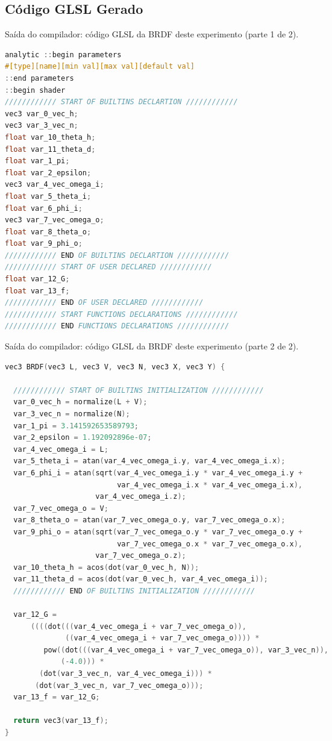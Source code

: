 \subsection{Código GLSL Gerado}
\begin{codigo}[H]
    \caption{\small Saída do compilador: código GLSL da BRDF deste experimento (parte 1 de 2).}
    \label{cod-duer-glsl-pt-1}
\begin{lstlisting}[language=C, inputencoding=utf8]
analytic ::begin parameters
#[type][name][min val][max val][default val]
::end parameters
::begin shader
//////////// START OF BUILTINS DECLARTION ////////////
vec3 var_0_vec_h;
vec3 var_3_vec_n;
float var_10_theta_h;
float var_11_theta_d;
float var_1_pi;
float var_2_epsilon;
vec3 var_4_vec_omega_i;
float var_5_theta_i;
float var_6_phi_i;
vec3 var_7_vec_omega_o;
float var_8_theta_o;
float var_9_phi_o;
//////////// END OF BUILTINS DECLARTION ////////////
//////////// START OF USER DECLARED ////////////
float var_12_G;
float var_13_f;
//////////// END OF USER DECLARED ////////////
//////////// START FUNCTIONS DECLARATIONS ////////////
//////////// END FUNCTIONS DECLARATIONS ////////////

\end{lstlisting}
\end{codigo}

\begin{codigo}[H]
    \caption{\small Saída do compilador: código GLSL da BRDF deste experimento (parte 2 de 2).}
    \label{cod-duer-glsl-pt-2}
\begin{lstlisting}[language=C, inputencoding=utf8]
vec3 BRDF(vec3 L, vec3 V, vec3 N, vec3 X, vec3 Y) {

  //////////// START OF BUILTINS INITIALIZATION ////////////
  var_0_vec_h = normalize(L + V);
  var_3_vec_n = normalize(N);
  var_1_pi = 3.141592653589793;
  var_2_epsilon = 1.192092896e-07;
  var_4_vec_omega_i = L;
  var_5_theta_i = atan(var_4_vec_omega_i.y, var_4_vec_omega_i.x);
  var_6_phi_i = atan(sqrt(var_4_vec_omega_i.y * var_4_vec_omega_i.y +
                          var_4_vec_omega_i.x * var_4_vec_omega_i.x),
                     var_4_vec_omega_i.z);
  var_7_vec_omega_o = V;
  var_8_theta_o = atan(var_7_vec_omega_o.y, var_7_vec_omega_o.x);
  var_9_phi_o = atan(sqrt(var_7_vec_omega_o.y * var_7_vec_omega_o.y +
                          var_7_vec_omega_o.x * var_7_vec_omega_o.x),
                     var_7_vec_omega_o.z);
  var_10_theta_h = acos(dot(var_0_vec_h, N));
  var_11_theta_d = acos(dot(var_0_vec_h, var_4_vec_omega_i));
  //////////// END OF BUILTINS INITIALIZATION ////////////

  var_12_G =
      ((((dot(((var_4_vec_omega_i + var_7_vec_omega_o)),
              ((var_4_vec_omega_i + var_7_vec_omega_o)))) *
         pow((dot(((var_4_vec_omega_i + var_7_vec_omega_o)), var_3_vec_n)),
             (-4.0))) *
        (dot(var_3_vec_n, var_4_vec_omega_i))) *
       (dot(var_3_vec_n, var_7_vec_omega_o)));
  var_13_f = var_12_G;

  return vec3(var_13_f);
}
\end{lstlisting}
\end{codigo}


